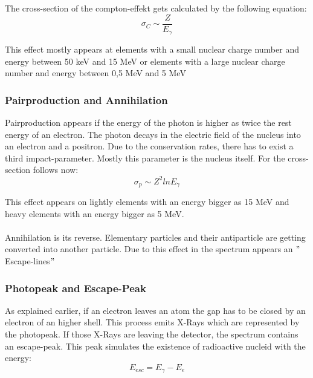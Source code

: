 
The cross-section of the compton-effekt gets calculated by the following equation:
	\begin{equation}
	\sigma_{C} \sim \frac{Z}{E_{\gamma}}
	\end{equation}
	
This effect mostly appears at elements with a small nuclear charge number and energy between 50 keV and 15 MeV or elements with a large  nuclear charge number and energy between 0,5 MeV and 5 MeV 
	
	\subsubsection*{Pairproduction and Annihilation}

Pairproduction appears if the energy of the photon is higher as twice the rest energy of an electron. The photon decays in the electric field of the nucleus into an electron and a positron. Due to the conservation rates, there has to exist a third impact-parameter. Mostly this parameter is the nucleus itself. For the cross-section follows now:
	\begin{equation}
	\sigma_{p} \sim Z^{2} ln E_{\gamma}
	\end{equation}

This effect appears on lightly elements with an energy bigger as 15 MeV and heavy elements with an energy bigger as 5 MeV.\\
\\
Annihilation is its reverse. Elementary particles and their antiparticle are getting converted into another particle. Due to this effect in the spectrum  appears an $"$Escape-lines$"$ 

	\subsubsection*{Photopeak and Escape-Peak}
	
As explained earlier, if an electron leaves an atom the gap has to be closed by an electron of an higher shell. This process emits X-Rays which are represented by the photopeak. If those X-Rays are leaving the detector, the spectrum contains an escape-peak. This peak simulates the existence of radioactive nucleid with the energy:
	\begin{equation}
	E_{esc} = E_{\gamma} - E_{e}
	\end{equation}


